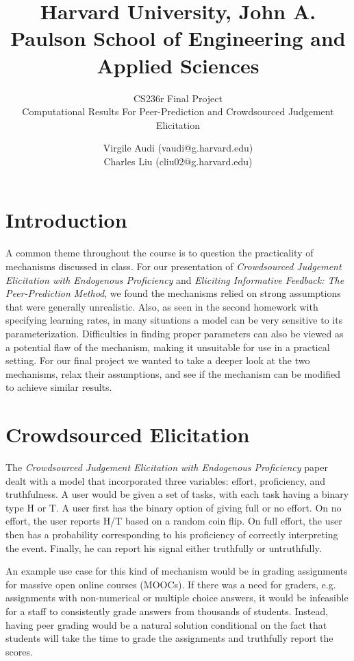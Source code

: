 \documentclass{scrartcl}
\title{Harvard University, John A. Paulson School of Engineering and Applied Sciences \newline}
\subtitle{CS236r Final Project\\ Computational Results For Peer-Prediction and Crowdsourced Judgement Elicitation}
\author{Virgile Audi (vaudi@g.harvard.edu)\\
		Charles Liu (cliu02@g.harvard.edu)}
\begin{document}
 
\maketitle
\section*{Introduction}

A common theme throughout the course is to question the practicality of mechanisms discussed in class. For our presentation of \emph{Crowdsourced Judgement Elicitation with Endogenous Proficiency} and \emph{Eliciting Informative Feedback: The Peer-Prediction Method}, we found the mechanisms relied on strong assumptions that were generally unrealistic. Also, as seen in the second homework with specifying learning rates, in many situations a model can be very sensitive to its parameterization. Difficulties in finding proper parameters can also be viewed as a potential flaw of the mechanism, making it unsuitable for use in a practical setting. For our final project we wanted to take a deeper look at the two mechanisms, relax their assumptions, and see if the mechanism can be modified to achieve similar results.

\section{Crowdsourced Elicitation}

The \emph{Crowdsourced Judgement Elicitation with Endogenous Proficiency} paper dealt with a model that incorporated three variables: effort, proficiency, and truthfulness. A user would be given a set of tasks, with each task having a binary type H or T. A user first has the binary option of giving full or no effort. On no effort, the user reports H/T based on a random coin flip. On full effort, the user then has a probability corresponding to his proficiency of correctly interpreting the event. Finally, he can report his signal either truthfully or untruthfully. 

An example use case for this kind of mechanism would be in grading assignments for massive open online courses (MOOCs). If there was a need for graders, e.g. assignments with non-numerical or multiple choice answers, it would be infeasible for a staff to consistently grade answers from thousands of students. Instead, having peer grading would be a natural solution conditional on the fact that students will take the time to grade the assignments and truthfully report the scores.
\end{document}
